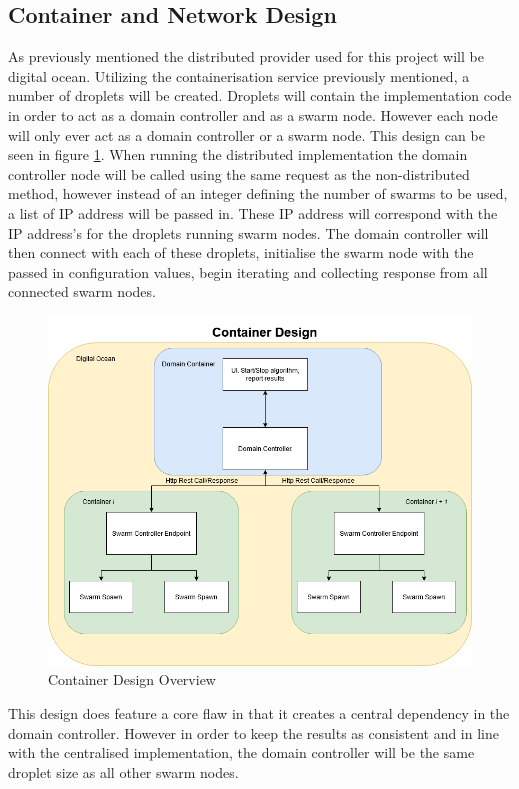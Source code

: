\documentclass[oneside,12pt]{book}
\begin{document}
\subsection{Container and Network Design}
As previously mentioned the distributed provider used for this project will be digital ocean. Utilizing the containerisation service previously mentioned, a number of droplets will be created. Droplets will contain the implementation code in order to act as a domain controller and as a swarm node. However each node will only ever act as a domain controller or a swarm node. This design can be seen in figure \ref{fig:ContainerDesignOverview}. When running the distributed implementation the domain controller node will be called using the same request as the non-distributed method, however instead of an integer defining the number of swarms to be used, a list of IP address will be passed in. These IP address will correspond with the IP address's for the droplets running swarm nodes. The domain controller will then connect with each of these droplets, initialise the swarm node with the passed in configuration values, begin iterating and collecting response from all connected swarm nodes.

\begin{figure}[H]
    \centering
    \includegraphics[scale=0.4]{Images/ContainerDesign.png}
    \caption{Container Design Overview}
    \label{fig:ContainerDesignOverview}
\end{figure}

This design does feature a core flaw in that it creates a central dependency in the domain controller. However in order to keep the results as consistent and in line with the centralised implementation, the domain controller will be the same droplet size as all other swarm nodes. 
\end{document}
